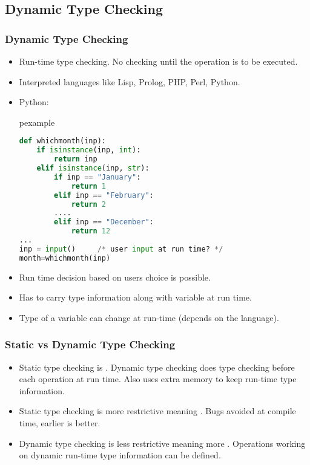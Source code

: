 \subsection{Dynamic Type Checking}
\begin{frame}[fragile]
 \frametitle{Dynamic Type Checking}
\begin{itemize}[<+->]
 \item Run-time type checking. No checking until the operation is to be executed.
 \item Interpreted languages like Lisp, Prolog, PHP, Perl, Python.
 \item Python:
\begin{beamercolorbox}{pexample}
\begin{lstlisting}[language=Python]
def whichmonth(inp):
    if isinstance(inp, int):
        return inp
    elif isinstance(inp, str):
        if inp == "January":
            return 1
        elif inp == "February":
            return 2
        ....
        elif inp == "December":
            return 12
...
inp = input()     /* user input at run time? */
month=whichmonth(inp)
\end{lstlisting}
\end{beamercolorbox}
\end{itemize}
\end{frame}

\begin{frame}
\begin{itemize}
\item Run time decision based on users choice is possible.
\item Has to carry type information along with variable at run time.
\item Type of a variable can change at run-time (depends on the language).
\end{itemize}
\end{frame}

\begin{frame}
 \frametitle{Static vs Dynamic Type Checking}
\begin{itemize}
 \item Static type checking is . Dynamic type checking does type checking before each
 operation at run time. Also uses extra memory to keep run-time type information.
 \item Static type checking is more restrictive meaning . Bugs avoided at compile time,
 earlier is better.
 \item Dynamic type checking is less restrictive meaning more
 . Operations working on
 dynamic run-time type information can be defined.
\end{itemize}
\end{frame}


